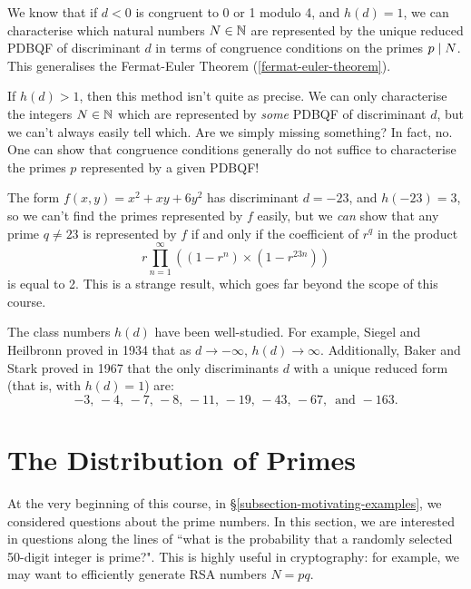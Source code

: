 \documentclass{article}
\begin{document}
\begin{remark}
	We know that if $d < 0$ is congruent to 0 or 1 modulo 4, and $h(d) = 1$, we can characterise which natural numbers $N \in \mathbb{N}$ are represented by the unique reduced PDBQF of discriminant $d$ in terms of congruence conditions on the primes $p \mid N$.
	This generalises the Fermat-Euler Theorem (\ref{fermat-euler-theorem}).

	If $h(d) > 1$, then this method isn't quite as precise. We can only characterise the integers $N \in \mathbb{N}$ which are represented by \textit{some} PDBQF of discriminant $d$, but we can't always easily tell which. Are we simply missing something?
	In fact, no. One can show that congruence conditions generally do not suffice to characterise the primes $p$ represented by a given PDBQF!
	
	The form $f(x, y) = x^2 + xy + 6y^2$ has discriminant $d = -23$, and $h(-23) = 3$, so we can't find the primes represented by $f$ easily, but we \textit{can} show that any prime $q \neq 23$ is represented by $f$ if and only if the coefficient of $r^q$ in the product
	\[
	r \prod_{n = 1}^\infty
	\left( (1 - r^n) \times (1-r^{23n}) \right)
	\]
	is equal to 2. This is a strange result, which goes far beyond the scope of this course.
\end{remark}

The class numbers $h(d)$ have been well-studied. For example, Siegel and Heilbronn proved in 1934 that as $d \to -\infty$, $h(d) \to \infty$. Additionally, Baker and Stark proved in 1967 that the only discriminants $d$ with a unique reduced form (that is, with $h(d) = 1$) are:
\[
-3, \, 
-4, \, 
-7, \, 
-8, \, 
-11, \, 
-19, \, 
-43, \, 
-67, \, 
\text{ and }
-163.
\]


\pagebreak
\section{The Distribution of Primes}
\label{subsection-distribution-of-primes}

At the very beginning of this course, in \S\ref{subsection-motivating-examples}, we considered questions about the prime numbers. In this section, we are interested in questions along the lines of ``what is the probability that a randomly selected 50-digit integer is prime?". This is highly useful in cryptography: for example, we may want to efficiently generate RSA numbers $N = pq$.
\end{document}
